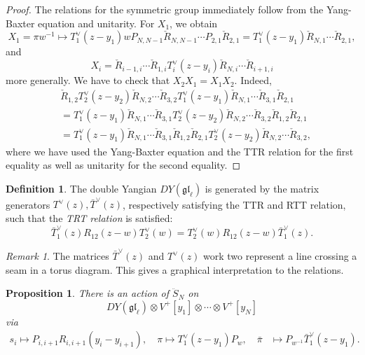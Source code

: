 \documentclass[11pt]{report}
\newtheorem{prop}[theorem]{Proposition}
\theoremstyle{definition}
\newtheorem{definition}[theorem]{Definition}
\theoremstyle{remark}
\newtheorem*{remark}{Remark}
\theoremstyle{remark}
\begin{document}
\begin{proof}
The relations for the symmetric group immediately follow from the Yang-Baxter equation and unitarity. For $X_1$, we obtain
\begin{equation*}
X_1 = \pi w^{-1} \mapsto T_1^\vee(z-y_1) w P_{N,N-1} \check R_{N,N-1} \cdots P_{2,1} \check R_{2,1} = T_1^\vee(z-y_1) \check R_{N,1} \cdots \check R_{2,1},
\end{equation*}
and
\begin{equation*}
X_i = \check R_{i-1,i} \cdots \check R_{1,i} T_i^\vee(z-y_i) \check R_{N,i} \cdots \check R_{i+1,i}
\end{equation*}
more generally. We have to check that $X_2 X_1 = X_1 X_2$. Indeed,
\begin{align*}
&\check R_{1,2} T_2^\vee(z-y_2) \check R_{N,2} \cdots \check R_{3,2} T_1^\vee(z-y_1) \check R_{N,1} \cdots \check R_{3,1} \check R_{2,1} \\
&= T_1^\vee(z-y_1) \check R_{N,1} \cdots \check R_{3,1} T_2^\vee(z-y_2) \check R_{N,2} \cdots \check R_{3,2} \check R_{1,2} \check R_{2,1} \\
&= T_1^\vee(z-y_1) \check R_{N,1} \cdots \check R_{3,1} \check R_{1,2} \check R_{2,1} T_2^\vee(z-y_2) \check R_{N,2} \cdots \check R_{3,2},
\end{align*}
where we have used the Yang-Baxter equation and the TTR relation for the first equality as well as unitarity for the second equality.
\end{proof}

\begin{definition}
The double Yangian $DY(\mathfrak{gl}_\ell)$ is generated by the matrix generators $T^\vee(z),\bar T^\vee(z)$, respectively satisfying the TTR and RTT relation, such that the \emph{TRT relation} is satisfied:
\begin{equation*}
\bar T_1^\vee(z) R_{12}(z-w) T_2^\vee(w) = T_2^\vee(w) R_{12}(z-w) \bar T_1^\vee(z).
\end{equation*}
\end{definition}

\begin{remark}
The matrices $\bar T^\vee(z)$ and $T^\vee(z)$ work two represent a line crossing a seam in a torus diagram. This gives a graphical interpretation to the relations.
\end{remark}

\begin{prop}
There is an action of $\ddot S_N$ on
\begin{equation*}
DY(\mathfrak{gl}_\ell) \otimes V^+[y_1] \otimes \cdots \otimes V^+[y_N]
\end{equation*}
via
\begin{align*}
s_i \mapsto P_{i,i+1} R_{i,i+1}(y_i-y_{i+1}), \quad \pi \mapsto T_1^\vee(z-y_1) P_w, \quad \bar \pi &\mapsto P_{w^{-1}} \bar T_1^\vee(z-y_1).
\end{align*}
\end{prop}
\end{document}
